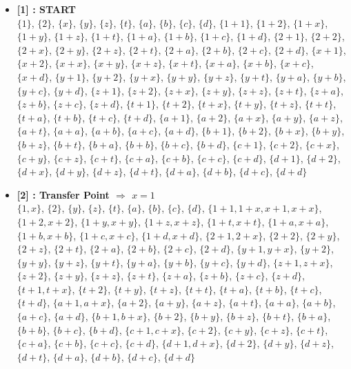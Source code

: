 \begin{itemize}

    \item \textbf{[1] : START}\\
        $\{1\}$, $\{2\}$, $\{x\}$, $\{y\}$, $\{z\}$, $\{t\}$, $\{a\}$, $\{b\}$, $\{c\}$, $\{d\}$, $\{1 + 1\}$, $\{1 + 2\}$, $\{1 + x\}$, $\{1 + y\}$, $\{1 + z\}$, $\{1 + t\}$, $\{1 + a\}$, $\{1 + b\}$, $\{1 + c\}$, $\{1 + d\}$, $\{2 + 1\}$, $\{2 + 2\}$, $\{2 + x\}$, $\{2 + y\}$, $\{2 + z\}$, $\{2 + t\}$, $\{2 + a\}$, $\{2 + b\}$, $\{2 + c\}$, $\{2 + d\}$, $\{x + 1\}$, $\{x + 2\}$, $\{x + x\}$, $\{x + y\}$, $\{x + z\}$, $\{x + t\}$, $\{x + a\}$, $\{x + b\}$, $\{x + c\}$, $\{x + d\}$, $\{y + 1\}$, $\{y + 2\}$, $\{y + x\}$, $\{y + y\}$, $\{y + z\}$, $\{y + t\}$, $\{y + a\}$, $\{y + b\}$, $\{y + c\}$, $\{y + d\}$, $\{z + 1\}$, $\{z + 2\}$, $\{z + x\}$, $\{z + y\}$, $\{z + z\}$, $\{z + t\}$, $\{z + a\}$, $\{z + b\}$, $\{z + c\}$, $\{z + d\}$, $\{t + 1\}$, $\{t + 2\}$, $\{t + x\}$, $\{t + y\}$, $\{t + z\}$, $\{t + t\}$, $\{t + a\}$, $\{t + b\}$, $\{t + c\}$, $\{t + d\}$, $\{a + 1\}$, $\{a + 2\}$, $\{a + x\}$, $\{a + y\}$, $\{a + z\}$, $\{a + t\}$, $\{a + a\}$, $\{a + b\}$, $\{a + c\}$, $\{a + d\}$, $\{b + 1\}$, $\{b + 2\}$, $\{b + x\}$, $\{b + y\}$, $\{b + z\}$, $\{b + t\}$, $\{b + a\}$, $\{b + b\}$, $\{b + c\}$, $\{b + d\}$, $\{c + 1\}$, $\{c + 2\}$, $\{c + x\}$, $\{c + y\}$, $\{c + z\}$, $\{c + t\}$, $\{c + a\}$, $\{c + b\}$, $\{c + c\}$, $\{c + d\}$, $\{d + 1\}$, $\{d + 2\}$, $\{d + x\}$, $\{d + y\}$, $\{d + z\}$, $\{d + t\}$, $\{d + a\}$, $\{d + b\}$, $\{d + c\}$, $\{d + d\}$

    \item \textbf{[2] : Transfer Point $\Rightarrow$ $x = 1$}\\
        $\{1, x\}$, $\{2\}$, $\{y\}$, $\{z\}$, $\{t\}$, $\{a\}$, $\{b\}$, $\{c\}$, $\{d\}$, $\{1 + 1, 1 + x, x + 1, x + x\}$, $\{1 + 2, x + 2\}$, $\{1 + y, x + y\}$, $\{1 + z, x + z\}$, $\{1 + t, x + t\}$, $\{1 + a, x + a\}$, $\{1 + b, x + b\}$, $\{1 + c, x + c\}$, $\{1 + d, x + d\}$, $\{2 + 1, 2 + x\}$, $\{2 + 2\}$, $\{2 + y\}$, $\{2 + z\}$, $\{2 + t\}$, $\{2 + a\}$, $\{2 + b\}$, $\{2 + c\}$, $\{2 + d\}$, $\{y + 1, y + x\}$, $\{y + 2\}$, $\{y + y\}$, $\{y + z\}$, $\{y + t\}$, $\{y + a\}$, $\{y + b\}$, $\{y + c\}$, $\{y + d\}$, $\{z + 1, z + x\}$, $\{z + 2\}$, $\{z + y\}$, $\{z + z\}$, $\{z + t\}$, $\{z + a\}$, $\{z + b\}$, $\{z + c\}$, $\{z + d\}$, $\{t + 1, t + x\}$, $\{t + 2\}$, $\{t + y\}$, $\{t + z\}$, $\{t + t\}$, $\{t + a\}$, $\{t + b\}$, $\{t + c\}$, $\{t + d\}$, $\{a + 1, a + x\}$, $\{a + 2\}$, $\{a + y\}$, $\{a + z\}$, $\{a + t\}$, $\{a + a\}$, $\{a + b\}$, $\{a + c\}$, $\{a + d\}$, $\{b + 1, b + x\}$, $\{b + 2\}$, $\{b + y\}$, $\{b + z\}$, $\{b + t\}$, $\{b + a\}$, $\{b + b\}$, $\{b + c\}$, $\{b + d\}$, $\{c + 1, c + x\}$, $\{c + 2\}$, $\{c + y\}$, $\{c + z\}$, $\{c + t\}$, $\{c + a\}$, $\{c + b\}$, $\{c + c\}$, $\{c + d\}$, $\{d + 1, d + x\}$, $\{d + 2\}$, $\{d + y\}$, $\{d + z\}$, $\{d + t\}$, $\{d + a\}$, $\{d + b\}$, $\{d + c\}$, $\{d + d\}$


\end{itemize}
